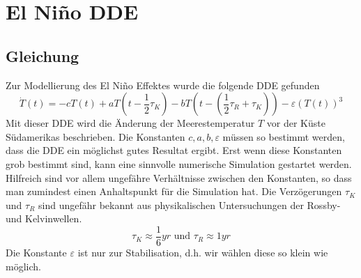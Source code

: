 \section{El Niño DDE}


\subsection{Gleichung}
Zur Modellierung des El Niño Effektes wurde die folgende DDE gefunden %
\begin{equation} \label{eldde}
\dot{T}(t)=-cT(t)+aT(t-\frac{1}{2}\tau_K)-bT(t-(\frac{1}{2}\tau_R+\tau_K))-\varepsilon(T(t))^3
\end{equation}
Mit dieser DDE wird die Änderung der Meerestemperatur $T$ vor der Küste Südamerikas beschrieben.
Die Konstanten $c,a,b,\varepsilon$ müssen so bestimmt werden, dass die DDE ein möglichst gutes Resultat ergibt.
Erst wenn diese Konstanten grob bestimmt sind, kann eine sinnvolle numerische Simulation gestartet werden.
Hilfreich sind vor allem ungefähre Verhältnisse zwischen den Konstanten, so dass man zumindest einen Anhaltspunkt für die Simulation hat.
Die Verzögerungen $\tau_K$ und $\tau_R$ sind ungefähr bekannt aus physikalischen Untersuchungen der Rossby- und Kelvinwellen.
\begin{equation}
	\tau_K \approx \frac{1}{6}yr \text{ und } \tau_R \approx 1 yr
\end{equation}
Die Konstante $\varepsilon$ ist nur zur Stabilisation, d.h. wir wählen diese so klein wie möglich.


